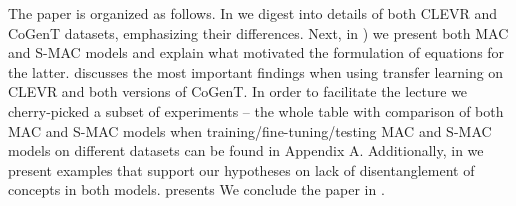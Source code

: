 The paper is organized as follows.
In  we digest into details of both CLEVR and CoGenT datasets, emphasizing their differences.
Next, in ) we present both MAC and S-MAC models and explain what motivated the formulation of equations for the latter.
 discusses the most important findings when using transfer learning on CLEVR and both versions of CoGenT.
In order to facilitate the lecture we cherry-picked a subset of experiments -- the whole table with comparison of both MAC and S-MAC models when training/fine-tuning/testing MAC and S-MAC models on different datasets can be found in Appendix A.
Additionally, in  we present examples that support our hypotheses on lack of disentanglement of concepts in both models.
 presents 
We conclude the paper in .
